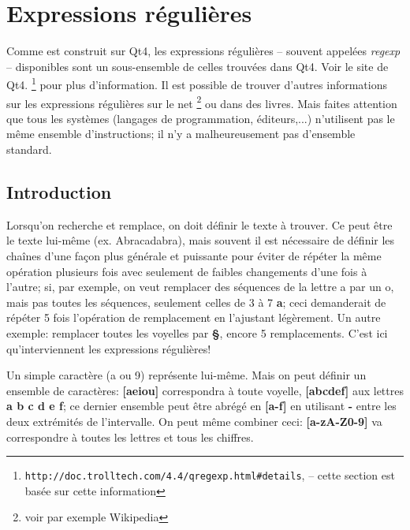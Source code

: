 
\chapter{Expressions r{\'e}guli{\`e}res}
\label{sec:regexp}

Comme \Tw{} est construit sur Qt4, les expressions régulières -- souvent appelées \emph{regexp} -- disponibles sont un sous-ensemble de celles trouvées dans Qt4. Voir le site de Qt4.
\footnote{\label{fn.regexpQt}\texttt{http://doc.trolltech.com/4.4/qregexp.html\#details}, -- cette section est basée sur cette information} pour plus d'information. Il est possible de trouver d'autres informations sur les expressions régulières sur le net \footnote{voir par exemple Wikipedia} ou dans des livres. Mais faites attention que tous les systèmes (langages de programmation, éditeurs,...) n'utilisent pas le même ensemble d'instructions; il n'y a malheureusement pas \og d'ensemble standard\fg.

\section{Introduction}

Lorsqu'on recherche et remplace, on doit définir le texte à trouver. Ce peut être le texte lui-même (ex. \og Abracadabra\fg), mais souvent il est nécessaire de définir les chaînes d'une façon plus générale et puissante pour éviter de répéter la même opération plusieurs fois avec seulement de faibles changements d'une fois à l'autre; si, par exemple, on veut remplacer des séquences de la lettre \og a\fg{} par un \og o\fg{}, mais pas toutes les séquences, seulement celles de 3 à 7 \textbf{a}; ceci demanderait de répéter 5 fois l'opération de remplacement en l'ajustant légèrement. Un autre exemple: remplacer toutes les voyelles par \textbf{§}, encore 5 remplacements. C'est ici qu'interviennent les expressions régulières!

Un simple caractère (a ou 9) représente lui-même. Mais on peut définir un ensemble de caractères: \textbf{[aeiou]} correspondra à toute voyelle, \textbf{[abcdef]} aux lettres \textbf{a b c d e f}; ce dernier ensemble peut être abrégé en \textbf{[a-f]} en utilisant \og\textbf{-}\fg{} entre les deux extrémités de l'intervalle. On peut même combiner ceci: \textbf{[a-zA-Z0-9]} va correspondre à toutes les lettres et tous les chiffres.

